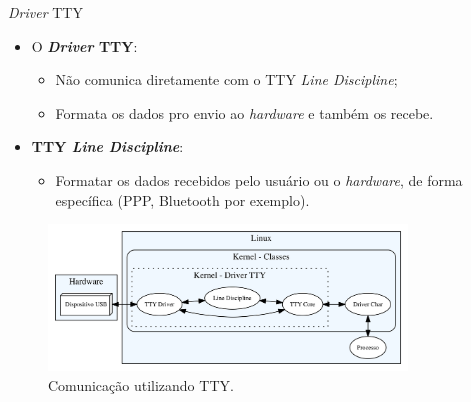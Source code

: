 	\begin{frame}{\textit{Driver} TTY}
		\begin{itemize}
			\item O \textbf{\textit{Driver} TTY}:
			\begin{itemize}
				\item Não comunica diretamente com o TTY \textit{Line Discipline};
				\item Formata os dados pro envio ao \textit{hardware} e também os recebe.
			\end{itemize}
			\item \textbf{TTY \textit{Line Discipline}}:
			\begin{itemize}
				\item Formatar os dados recebidos pelo usuário ou o \textit{hardware}, de forma específica (PPP, Bluetooth por exemplo).
			\end{itemize}
		\end{itemize}
		\begin{figure}[p]
			\centering
			\includegraphics[width=0.85\textwidth]{img/tty.png}
			\caption{Comunicação utilizando TTY.}
			\label{fig:tty}
		\end{figure}
	\end{frame}

